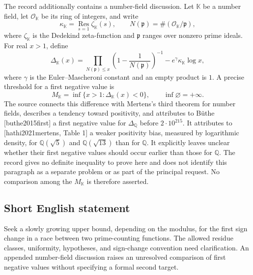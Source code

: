 \documentclass[11pt]{article}
\newcommand{\Q}{\mathbb{Q}}
\begin{document}
The record additionally contains a number-field discussion. Let \(\mathbb K\) be a number field, let \(\mathcal O_{\mathbb K}\) be its ring of integers, and write
\[
\kappa_{\mathbb K}=\operatorname*{Res}_{s=1}\zeta_{\mathbb K}(s),
\qquad N(\mathfrak p)=\#(\mathcal O_{\mathbb K}/\mathfrak p),
\]
where \(\zeta_{\mathbb K}\) is the Dedekind zeta-function and \(\mathfrak p\) ranges over nonzero prime ideals. For real \(x>1\), define
\[
\Delta_{\mathbb K}(x)=
\prod_{N(\mathfrak p)\leq x}\left(1-\frac{1}{N(\mathfrak p)}\right)^{-1}
-e^{\gamma}\kappa_{\mathbb K}\log x,
\]
where \(\gamma\) is the Euler--Mascheroni constant and an empty product is \(1\). A precise threshold for a first negative value is
\[
M_{\mathbb K}=\inf\{x>1:\Delta_{\mathbb K}(x)<0\},
\qquad \inf\varnothing=+\infty.
\]
The source connects this difference with Mertens's third theorem for number fields, describes a tendency toward positivity, and attributes to B\"uthe [buthe2015first] a first negative value for \(\Delta_{\Q}\) before \(2\cdot10^{215}\). It attributes to [hathi2021mertens, Table 1] a weaker positivity bias, measured by logarithmic density, for \(\Q(\sqrt5)\) and \(\Q(\sqrt{13})\) than for \(\Q\). It explicitly leaves unclear whether their first negative values should occur earlier than those for \(\Q\). The record gives no definite inequality to prove here and does not identify this paragraph as a separate problem or as part of the principal request. No comparison among the \(M_{\mathbb K}\) is therefore asserted.
\subsection{Short English statement}
Seek a slowly growing upper bound, depending on the modulus, for the first sign change in a race between two prime-counting functions. The allowed residue classes, uniformity, hypotheses, and sign-change convention need clarification. An appended number-field discussion raises an unresolved comparison of first negative values without specifying a formal second target.
\end{document}
